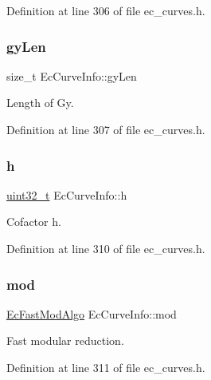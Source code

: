 Definition at line 306 of file ec\+\_\+curves.\+h.

\mbox{\label{structEcCurveInfo_a1ea7f1fc164a055dcd9a03f2112486b2}} 
\subsubsection{\texorpdfstring{gy\+Len}{gyLen}}
{\footnotesize\ttfamily size\+\_\+t Ec\+Curve\+Info\+::gy\+Len}



Length of Gy. 



Definition at line 307 of file ec\+\_\+curves.\+h.

\mbox{\label{structEcCurveInfo_acea935f64165e9ebb37c0c602d5767f5}} 
\subsubsection{\texorpdfstring{h}{h}}
{\footnotesize\ttfamily \hyperlink{stdint_8h_a435d1572bf3f880d55459d9805097f62}{uint32\+\_\+t} Ec\+Curve\+Info\+::h}



Cofactor h. 



Definition at line 310 of file ec\+\_\+curves.\+h.

\mbox{\label{structEcCurveInfo_af6ef70c1bdd9cdd65c9a4f1424a328ef}} 
\subsubsection{\texorpdfstring{mod}{mod}}
{\footnotesize\ttfamily \hyperlink{ec__curves_8h_ab3954d019918f80a5ba98921659bbb29}{Ec\+Fast\+Mod\+Algo} Ec\+Curve\+Info\+::mod}



Fast modular reduction. 



Definition at line 311 of file ec\+\_\+curves.\+h.

\mbox{\label{structEcCurveInfo_a8847f30d2d0c15ae97fe291f1be401f8}} 
